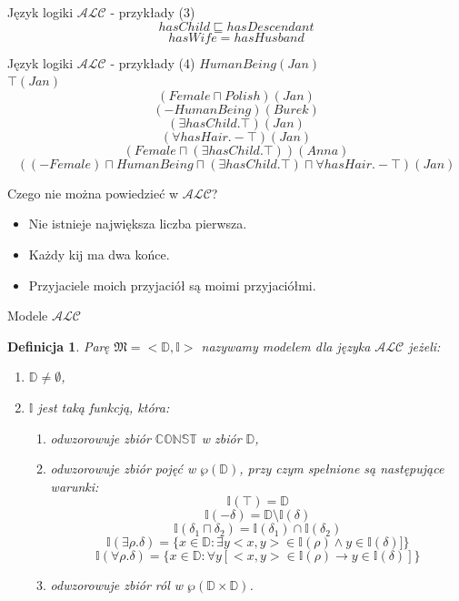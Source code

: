 \documentclass{beamer}
\newtheorem{definicja}{Definicja}
\begin{document}
\begin{frame}{Język logiki $\mathcal{ALC}$ - przykłady (3)}
%
$$hasChild \sqsubseteq hasDescendant$$
%
$$hasWife = hasHusband$$
\end{frame}

\begin{frame}{Język logiki $\mathcal{ALC}$ - przykłady (4)}
%
$HumanBeing(Jan)$\\
%
$\top(Jan)$\\
%
$$(Female \sqcap Polish)(Jan)$$
%
$$(- HumanBeing)(Burek)$$
%
$$(\exists hasChild . \top)(Jan)$$
%
$$(\forall hasHair . - \top)(Jan)$$
%
$$(Female \sqcap (\exists hasChild . \top))(Anna)$$
%
$$((- Female) \sqcap HumanBeing \sqcap (\exists hasChild . \top) \sqcap \forall hasHair . - \top)(Jan)$$
\end{frame}

\begin{frame}{Czego nie można powiedzieć w $\mathcal{ALC}$?}
%
\begin{itemize}
	\item Nie istnieje największa liczba pierwsza.
	\item Każdy kij ma dwa końce.
	\item Przyjaciele moich przyjaciół są moimi przyjaciółmi.
\end{itemize}
\end{frame}

\begin{frame}{Modele $\mathcal{ALC}$}
%
\begin{definicja}
Parę $\mathfrak{M} = <\mathbb{D}, \mathbb{I}>$ nazywamy modelem dla języka $\mathcal{ALC}$ jeżeli:
%
\begin{enumerate}
\item $\mathbb{D} \neq \emptyset$,
%
\item $\mathbb{I}$ jest taką funkcją, która:
%
\begin{enumerate}
\item odwzorowuje zbiór $\mathbb{CONST}$ w zbiór $\mathbb{D}$,
%
\item odwzorowuje zbiór pojęć w $\wp(\mathbb{D})$, przy czym spełnione są następujące warunki:
$$\mathbb{I}(\top) = \mathbb{D}$$
$$\mathbb{I}(- \delta) = \mathbb{D}\setminus \mathbb{I}(\delta)$$
$$\mathbb{I}(\delta_{1} \sqcap \delta_{2}) = \mathbb{I}(\delta_{1}) \cap \mathbb{I}(\delta_{2})$$
$$\mathbb{I}(\exists \rho . \delta) = \{x \in \mathbb{D} : \exists y <x, y> \in \mathbb{I}(\rho) \land y \in \mathbb{I}(\delta)]\}$$
$$\mathbb{I}(\forall \rho . \delta) = \{x \in \mathbb{D} : \forall y [<x, y> \in \mathbb{I}(\rho) \to y \in \mathbb{I}(\delta)]\}$$
%
\item odwzorowuje zbiór ról  w $\wp(\mathbb{D} \times \mathbb{D})$. %
\end{enumerate}
\end{enumerate}
\end{definicja}
\end{frame}
\end{document}
